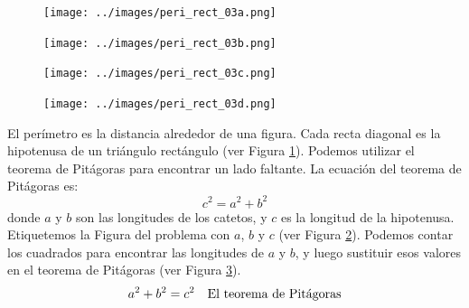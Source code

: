 \begin{solutionbox}{16cm}
    \begin{minipage}{0.4\textwidth}
        \begin{multicols}{2}
            \begin{figure}[H]
                \centering
                \texttt{[image: ../images/peri\_rect\_03a.png]}
                \caption{}
                \label{fig:peri_rect_03a}
            \end{figure}
            \begin{figure}[H]
                \centering
                \texttt{[image: ../images/peri\_rect\_03b.png]}
                \caption{}
                \label{fig:peri_rect_03b}
            \end{figure}
        \end{multicols}
        \begin{multicols}{2}
            \begin{figure}[H]
                \centering
                \texttt{[image: ../images/peri\_rect\_03c.png]}
                \caption{}
                \label{fig:peri_rect_03c}
            \end{figure}
            \begin{figure}[H]
                \centering
                \texttt{[image: ../images/peri\_rect\_03d.png]}
                \caption{}
                \label{fig:peri_rect_03d}
            \end{figure}
        \end{multicols}
    \end{minipage}\hfill
    \begin{minipage}{0.55\textwidth}
        El perímetro es la distancia alrededor de una figura.
        Cada recta diagonal es la hipotenusa de un triángulo rectángulo (ver Figura \ref{fig:peri_rect_03a}).
        Podemos utilizar el teorema de Pitágoras para encontrar un lado faltante.
        La ecuación del teorema de Pitágoras es:
        \[c^2=a^2+b^2\]
        donde $a$ y $b$ son las longitudes de los catetos, y $c$ es la longitud de la hipotenusa.
        Etiquetemos la Figura del problema con $a$, $b$ y $c$ (ver Figura \ref{fig:peri_rect_03b}).
        Podemos contar los cuadrados para encontrar las longitudes de $a$ y $b$, y luego sustituir esos valores en el teorema de Pitágoras (ver Figura \ref{fig:peri_rect_03c}).
        \begin{align*}
            a^2+b^2  =c^2 & \text{\quad El teorema de Pitágoras}                          \\

\end{align*}
\end{minipage}
\end{solutionbox}

